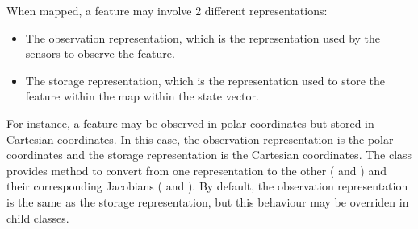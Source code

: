 \documentclass[letterpaper,10pt,english]{sphinxmanual}
\begin{document}
\begin{fulllineitems}
\begin{itemize}
\end{itemize}

\sphinxAtStartPar
When mapped, a feature may involve 2 different representations:
\begin{itemize}
\item {} 
\sphinxAtStartPar
The observation representation, which is the representation used by the sensors to observe the feature.

\item {} 
\sphinxAtStartPar
The storage representation, which is the representation used to store the feature within the map within the state vector.

\end{itemize}

\sphinxAtStartPar
For instance, a feature may be observed in polar coordinates but stored in Cartesian coordinates. In this case, the
observation representation is the polar coordinates and the storage representation is the Cartesian coordinates. The
class provides method to convert from one representation to the other ({\hyperref[\detokenize{FEKFMBLocalization:MapFeature.MapFeature.s2o}]{}} and {\hyperref[\detokenize{FEKFMBLocalization:MapFeature.MapFeature.o2s}]{}}) and their corresponding
Jacobians ({\hyperref[\detokenize{FEKFMBLocalization:MapFeature.MapFeature.J_s2o}]{}} and {\hyperref[\detokenize{FEKFMBLocalization:MapFeature.MapFeature.J_o2s}]{}}). By default, the observation representation is the same as the storage representation,
but this behaviour may be overriden in child classes.

\begin{fulllineitems}
\label{\detokenize{FEKFMBLocalization:MapFeature.MapFeature.__init__}}
\pysigstartsignatures
{}
\pysigstopsignatures
\end{fulllineitems}



\end{fulllineitems}
\end{document}
